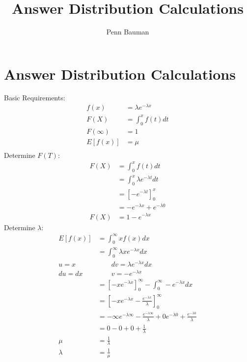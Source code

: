 \documentclass[12pt]{article}
\author{Penn Bauman}
\title{Answer Distribution Calculations}
\begin{document}
\section{Answer Distribution Calculations}

Basic Requirements:
\begin{align*}
	f(x) &= \lambda e^{-\lambda x} \\
	F(X) &= \int_{0}^{x} f(t) dt \\
	F(\infty) &= 1 \\
	E[f(x)] &= \mu \\
\end{align*}
Determine $F(T)$:
\begin{align*}
	F(X) &= \int_{0}^{x} f(t) dt \\
		&= \int_{0}^{x} \lambda e^{-\lambda t} dt \\
		&= \left[-e^{-\lambda t}\right]_{0}^{x} \\
		&= -e^{-\lambda x} + e^{-\lambda 0} \\
	F(X) &= 1 - e^{-\lambda x}
\end{align*}
Determine $\lambda$:
\begin{align*}
	E[f(x)] &= \int_{0}^{\infty} x f(x) dx \\
		&= \int_{0}^{\infty} \lambda x e^{-\lambda x} dx \\
	u = x & \ \ \ \ \ \ \ \ \ dv = \lambda e^{-\lambda x} dx \\
	du  =  dx & \ \ \ \ \ \ \ \ \ v = -e^{-\lambda x} \\
		&= \left[-x e^{-\lambda x}\right]_{0}^{\infty} - \int_{0}^{\infty} - e^{-\lambda x} dx \\
		&= \left[-x e^{-\lambda x} - \frac{e^{-\lambda x}}{\lambda}\right]_{0}^{\infty} \\
		&= -\infty e^{-\lambda \infty} - \frac{e^{-\lambda \infty}}{\lambda}
		+ 0 e^{-\lambda 0} + \frac{e^{-\lambda 0}}{\lambda} \\
		&= 0 - 0 + 0 + \frac{1}{\lambda} \\
	\mu &= \frac{1}{\lambda} \\
	\lambda &= \frac{1}{\mu} \\
\end{align*}
\end{document}
